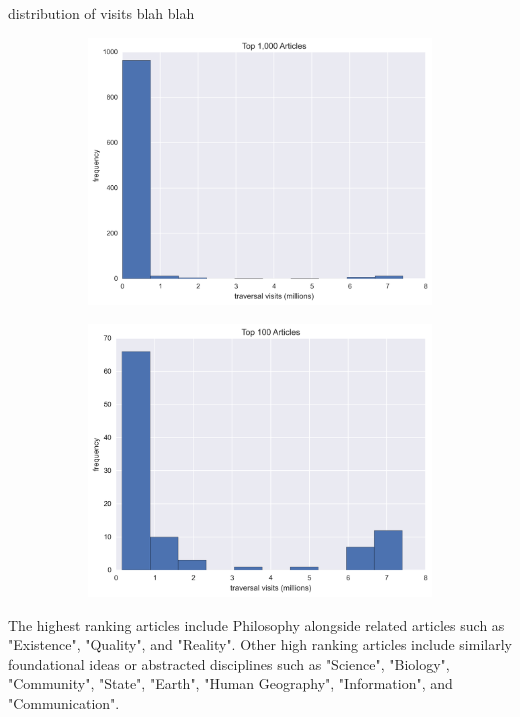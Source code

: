 \documentclass[twoside]{article}
\begin{document}
distribution of visits blah blah
\begin{figure}[H]
\centering
\caption{traversal visit distribution of highest ranking articles}
\begin{subfigure}{.5\textwidth}
  \centering
  \includegraphics[width=.9\linewidth]{graphics/top_1k_article_traversals.png}
\end{subfigure}%
\begin{subfigure}{.5\textwidth}
  \centering
  \includegraphics[width=.9\linewidth]{graphics/top_100_article_traversals.png}
\end{subfigure}
\end{figure}


The highest ranking articles include Philosophy alongside related articles such as "Existence", "Quality", and "Reality".
Other high ranking articles include similarly foundational ideas or abstracted disciplines such as "Science", "Biology", 
"Community", "State", "Earth", "Human Geography", "Information", and "Communication".
\end{document}
